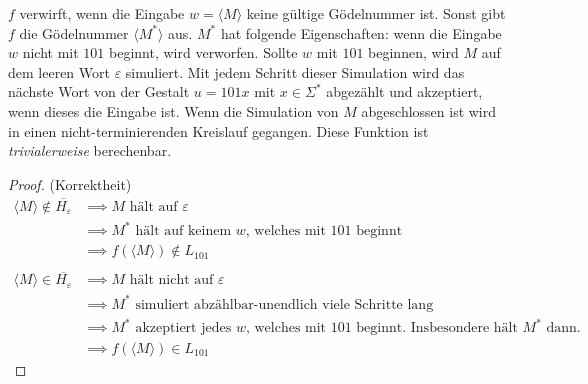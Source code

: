 $f$ verwirft, wenn die Eingabe $w = \langle M \rangle$ keine gültige Gödelnummer
ist. Sonst gibt $f$ die Gödelnummer $\langle M^* \rangle$ aus. $M^*$ hat
folgende Eigenschaften: wenn die Eingabe $w$ nicht mit $101$ beginnt, wird
verworfen. Sollte $w$ mit $101$ beginnen, wird $M$ auf dem leeren Wort
$\varepsilon$ simuliert. Mit jedem Schritt dieser Simulation wird das nächste
Wort von der Gestalt $u = 101x$ mit $x \in \Sigma^*$ abgezählt und akzeptiert,
wenn dieses die Eingabe ist. Wenn die Simulation von $M$ abgeschlossen ist wird
in einen nicht-terminierenden Kreislauf gegangen. Diese Funktion ist
\textit{trivialerweise} berechenbar.

\begin{proof}
	(Korrektheit)
\begin{align*}
	\langle M \rangle \notin \overline{H_{\varepsilon}}
	&\implies M \text{ hält auf } \varepsilon \\
	&\implies M^*  \text{ hält auf keinem $w$, welches mit 101 beginnt} \\
	&\implies f(\langle M \rangle) \notin L_{101}
	\\\\
	\langle M \rangle \in \overline{H_{\varepsilon}}
	&\implies \text{$M$ hält nicht auf $\varepsilon$} \\
	&\implies M^*  \text{ simuliert abzählbar-unendlich viele Schritte lang} \\
	&\implies M^*  \text{ akzeptiert jedes $w$, welches mit 101 beginnt.
		Insbesondere hält $M^*$ dann.} \\
	&\implies f(\langle M \rangle) \in L_{101}
\end{align*}
\end{proof}
